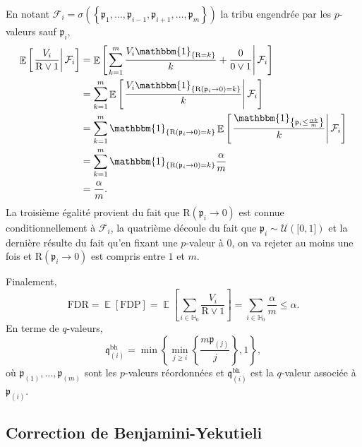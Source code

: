 \documentclass[12pt,a4paper]{reedthesis}
\newcommand \indic {\mathbbm{1}}
\DeclareMathOperator*{\esp}{\mathbb{E}}
\newcommand \EE [1]{\esp\left[{#1}\right]}
\newcommand \unif [1] {\mathcal{U}\left({#1}\right)}
\newcommand \pv {\mathfrak{p}}
\newcommand \qv {\mathfrak{q}}
\theoremstyle{definition}
\theoremstyle{definition}
\theoremstyle{definition}
\theoremstyle{remark}
\begin{document}
En notant \(\mathcal{F}_i = \sigma\left(\left\{\pv_1, \ldots, \pv_{i-1}, \pv_{i+1}, \ldots, \pv_m \right\}\right)\) la tribu engendrée par les \(p\)-valeurs sauf \(\pv_i\),
\begin{equation*}
\begin{aligned}
\EE{\left.\frac{V_i}{\text{R}\vee 1} \right| \mathcal{F}_i} & = \EE{\left.\sum_{k = 1}^m\frac{V_i\indic_{\left\{\text{R}=k\right\}}}{k} + \frac{0}{0\vee1} \right| \mathcal{F}_i} \\
& = \sum_{k = 1}^m \EE{\left.\frac{V_i\indic_{\left\{\text{R}(\pv_i \rightarrow 0)=k\right\}}}{k}\right| \mathcal{F}_i} \\
& = \sum_{k = 1}^m \indic_{\left\{\text{R}(\pv_i \rightarrow 0)=k\right\}} \EE{\left.\frac{\indic_{\left\{\pv_i \leq \frac{\alpha k}{m}\right\}}}{k}\right| \mathcal{F}_i} \\
& = \sum_{k = 1}^m \indic_{\left\{\text{R}(\pv_i \rightarrow 0)=k\right\}} \frac{\alpha}{m} \\
& = \frac{\alpha}{m}.
\end{aligned}
\end{equation*}
La troisième égalité provient du fait que \(\text{R}(\pv_i \rightarrow 0)\) est connue conditionnellement à \(\mathcal{F}_i\), la quatrième découle du fait que \(\pv_i \sim \unif{\mathopen[0, 1\mathclose]}\) et la dernière résulte du fait qu'en fixant une \(p\)-valeur à \(0\), on va rejeter au moins une fois et \(\text{R}(\pv_i \rightarrow 0)\) est compris entre \(1\) et \(m\).

Finalement,
\begin{equation*}
\text{FDR} = \EE{\text{FDP}} = \EE{\sum_{i\in \mathbb{H}_0} \frac{V_i}{\text{R} \vee 1}} = \sum_{i\in \mathbb{H}_0}\frac{\alpha}{m} \leq \alpha.
\end{equation*}
En terme de \(q\)-valeurs,
\begin{equation*}
\qv^{\text{bh}}_{(i)} = \min\left\{\min_{j\ge i}\left\{\frac{m\pv_{(j)}}{j}\right\},1\right\},
\end{equation*}
où \(\pv_{(1)}, \ldots, \pv_{(m)}\) sont les \(p\)-valeurs réordonnées et \(\qv^{\text{bh}}_{(i)}\) est la \(q\)-valeur associée à \(\pv_{(i)}\).

\hypertarget{correction-de-benjamini-yekutieli}{%
\subsection{Correction de Benjamini-Yekutieli}\label{correction-de-benjamini-yekutieli}}
\end{document}
